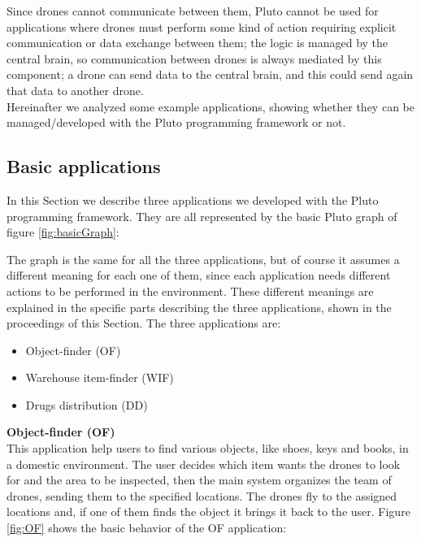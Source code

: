 Since drones cannot communicate between them, Pluto cannot be used for applications where drones must perform some kind of action requiring explicit communication or data exchange between them; the logic is managed by the central brain, so communication between drones is always mediated by this component; a drone can send data to the central brain, and this could send again that data to another drone.
\\
Hereinafter we analyzed some  example applications, showing whether they can be managed/developed with the Pluto programming framework or not.
\\

\subsection{Basic applications}

In this Section we describe three applications we developed with the Pluto programming framework.
They are all represented by the basic Pluto graph of figure \ref{fig:basicGraph}:


The graph is the same for all the three applications, but of course it assumes a different meaning for each one of them, since each application needs different actions to be performed in the environment.
These different meanings are explained in the specific parts describing the three applications, shown in the proceedings of this Section.
The three applications are:

\begin{itemize}
\item {Object-finder (OF)}
\item {Warehouse item-finder (WIF)}
\item {Drugs distribution (DD)}
\end{itemize}


\textbf{Object-finder (OF)}
\\

This application help users to find various objects, like shoes, keys and books, in a domestic environment.
The user decides which item wants the drones to look for and the area to be inspected, then
the main system organizes the team of drones, sending them to the specified locations.
The drones fly to the assigned locations and, if one of them finds the object it brings it back to the user.
Figure \ref{fig:OF} shows the basic behavior of the OF application:


